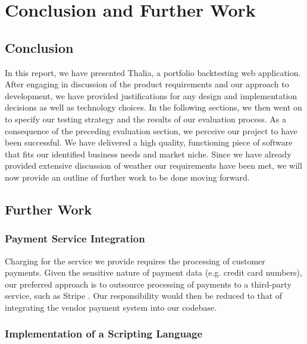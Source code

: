 \documentclass[main.tex]{subfiles}
\begin{document}
\section{Conclusion and Further Work}


\subsection{Conclusion}

In this report, we have presented Thalia, a portfolio backtesting web application. After engaging in discussion of the product requirements and our approach to development, we have provided justifications for any design and implementation decisions as well as technology choices. In the following sections, we then went on to specify our testing strategy and the results of our evaluation process. \newline
As a consequence of the preceding evaluation section, we perceive our project to have been successful. We have delivered a high quality, functioning piece of software that fits our identified business needs and market niche. Since we have already provided extensive discussion of weather our requirements have been met, we will now provide an outline of further work to be done moving forward.

\subsection{Further Work}

\subsubsection{Payment Service Integration}

Charging for the service we provide requires the processing of customer payments. Given the sensitive nature of payment data (e.g. credit card numbers), our preferred approach is to outsource processing of payments to a third-party service, such as Stripe \cite{stripe}. Our responsibility would then be reduced to that of integrating the vendor payment system into our codebase.

\subsubsection{Implementation of a Scripting Language}
\end{document}
